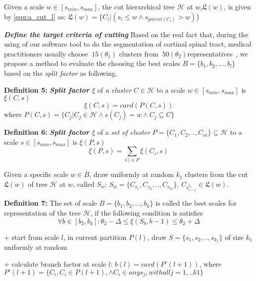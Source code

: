 Given a scale $w \in [s_{min},s_{max}]$, the cut hierarchical tree $\mathcal{H}$ at $w$,$\mathfrak{L}(w)$, is given by \ref{equ:a_cut_l} as: $\mathfrak{L}(w) = \{C_i | (s_i \leq w  \wedge s_{parent(C_i)} > w)\}$


\textbf{\textit{Define the target criteria of cutting}}
Based on the real fact that, during the using of our software tool to do the segmentation of cortinal spinal tract, medical practitioners usually choose $~15 (\theta_1)$ clusters from $~50 (\theta_2)$representatives~\cite{prni2013-boi}, we propose a method to evaluate the choosing the best scales $\mathsf{\textit{B}} = \{b_1, b_2, \ldots, b_l\}$ based on the \textit{split factor} as following.

\textbf{Definition 5:} \textbf{\textit{Split factor $\xi$}} of \textit{a cluster} $C \in \mathcal{H}$ to a scale $w \in [s_{min},s_{max}]$ is $\xi(C,s)$
\begin{equation}
\xi(C,s) = card(P(C,s))
\end{equation}
where $P(C,s) = \{ C_j | C_j \in \mathcal{H} \wedge s(C_j) = w \wedge C_j \subseteq C \}$ 

\textbf{Definition 6:} \textbf{\textit{Split factor $\xi$}} of a \textit{set of cluster} $P=\{C_1, C_2,.., C_m\} \subseteq \mathcal{H}$ to a scale $s \in [s_{min},s_{max}]$ is $\xi(P,s)$
\begin{equation}
\xi(P,s) = \sum_{C_i \in P}\xi(C_i,s)
\end{equation}

Given a specific scale $w \in \mathsf{\textit{B}}$, draw uniformly at random $k_1$ clusters from the cut $\mathfrak{L}(w)$ of tree $\mathcal{H}$ at $w$, called $S_w$: $S_{w}=\{C_{s_1}, C_{s_2},.., C_{s_{k_1}}\}$, $C_{s_{i=1}^{k_1}} \in \mathfrak{L}(w)$.

\textbf{Definition 7:} The set of scale $\mathsf{\textit{B}} = \{b_1, b_2, \ldots, b_k\}$ is called the best scales for representation of the tree $\mathcal{H}$, if the following condition is satisfies
\begin{equation}
\forall b \in [b_2,b_k]: \theta_2 - \Delta \leq \xi(S_b,b-1) \leq \theta_2 + \Delta 
\end{equation}

+ start from scale $l$, in current partition $P(l)$, draw $S=\{s_1,s_2,..,s_{k_1}\}$ of size $k_1$ uniformly at random

+ calculate branch factor at scale $l$: $b(l) = card(P'(l+1))$, where $P'(l+1) = \{C_i, C_i \in P(l+1), \wedge C_i \in any s_j, with all j =1,..k1\}$

